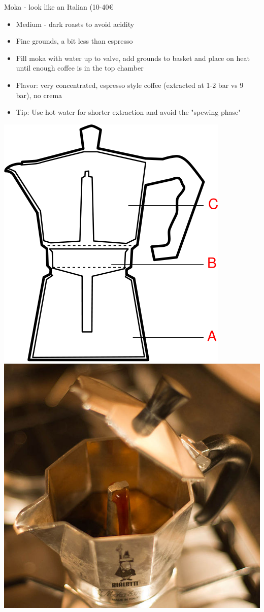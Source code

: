 \documentclass[10pt,graphics,aspectratio=169,table]{beamer}
\begin{document}
\begin{frame}{Moka - look like an Italian (10-40€}
    \begin{itemize}
        \item Medium - dark roasts to avoid acidity
        \item Fine grounds, a bit less than espresso
        \item Fill moka with water up to valve, add grounds to basket and place on heat until enough coffee is in the top chamber 
        \item Flavor: very concentrated, espresso style coffee (extracted at 1-2 bar vs 9 bar), no crema
        \item Tip: Use hot water for shorter extraction and avoid the "spewing phase"
    \end{itemize}
        \includegraphics[scale=0.25]{img/421px-MokaCoffeePot.svg.png} \cite{mokaShematics}
        \includegraphics[scale=0.6]{img/628px-Moka_brewing.jpg} \cite{mokaBrewing}
\end{frame}
\end{document}
